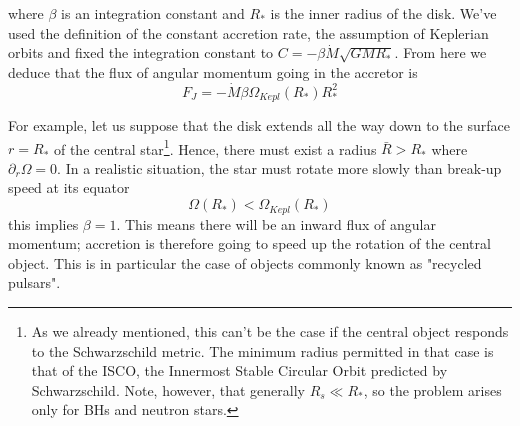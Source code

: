 where $\beta$ is an integration constant and $R_{*}$ is the inner radius of the disk. We've used the definition of the constant accretion rate, the assumption of Keplerian orbits and fixed the integration constant to $C = -\beta\dot{M}\sqrt{GMR_{*}}$. From here we deduce that the flux of angular momentum going in the accretor is 
\begin{equation*}
    F_{J} = -\dot{M}\beta\Omega_{Kepl}(R_{*})R_{*}^{2}
\end{equation*}
\par For example, let us suppose that the disk extends all the way down to the surface $r = R_{*}$ of the central star\footnote{As we already mentioned, this can't be the case if the central object responds to the Schwarzschild metric. The minimum radius permitted in that case is that of the ISCO, the Innermost Stable Circular Orbit predicted by Schwarzschild. Note, however, that generally $R_{s}\ll R_{*}$, so the problem arises only for BHs and neutron stars.}. Hence, there must exist a radius $\bar{R} > R_{*}$ where $\partial_{r}\Omega = 0$. In a realistic situation, the star must rotate more slowly than break-up speed at its equator
\begin{equation*}
    \Omega(R_{*}) < \Omega_{Kepl}(R_{*})
\end{equation*}
this implies $\beta = 1$. This means there will be an inward flux of angular momentum; accretion is therefore going to speed up the rotation of the central object. This is in particular the case of objects commonly known as "recycled pulsars".
